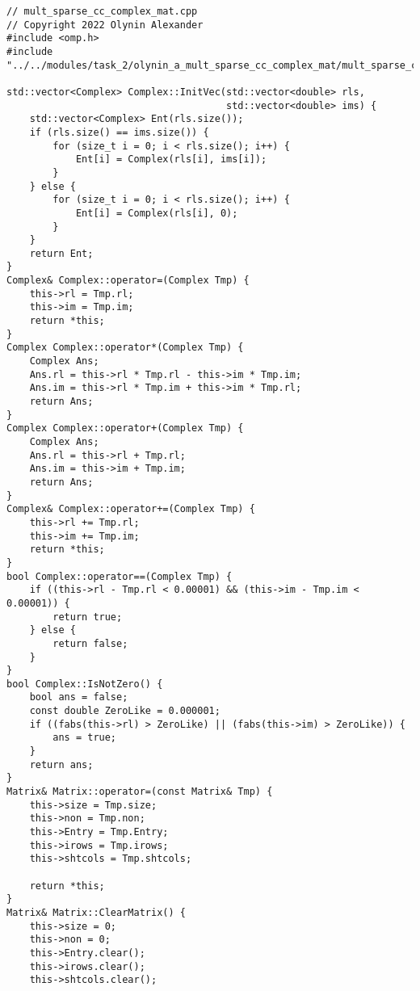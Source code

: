 \documentclass[12pt]{report}
\begin{document}
\begin{lstlisting}
// mult_sparse_cc_complex_mat.cpp
// Copyright 2022 Olynin Alexander
#include <omp.h>
#include "../../modules/task_2/olynin_a_mult_sparse_cc_complex_mat/mult_sparse_cc_complex_mat.h"

std::vector<Complex> Complex::InitVec(std::vector<double> rls,
                                      std::vector<double> ims) {
    std::vector<Complex> Ent(rls.size());
    if (rls.size() == ims.size()) {
        for (size_t i = 0; i < rls.size(); i++) {
            Ent[i] = Complex(rls[i], ims[i]);
        }
    } else {
        for (size_t i = 0; i < rls.size(); i++) {
            Ent[i] = Complex(rls[i], 0);
        }
    }
    return Ent;
}
Complex& Complex::operator=(Complex Tmp) {
    this->rl = Tmp.rl;
    this->im = Tmp.im;
    return *this;
}
Complex Complex::operator*(Complex Tmp) {
    Complex Ans;
    Ans.rl = this->rl * Tmp.rl - this->im * Tmp.im;
    Ans.im = this->rl * Tmp.im + this->im * Tmp.rl;
    return Ans;
}
Complex Complex::operator+(Complex Tmp) {
    Complex Ans;
    Ans.rl = this->rl + Tmp.rl;
    Ans.im = this->im + Tmp.im;
    return Ans;
}
Complex& Complex::operator+=(Complex Tmp) {
    this->rl += Tmp.rl;
    this->im += Tmp.im;
    return *this;
}
bool Complex::operator==(Complex Tmp) {
    if ((this->rl - Tmp.rl < 0.00001) && (this->im - Tmp.im < 0.00001)) {
        return true;
    } else {
        return false;
    }
}
bool Complex::IsNotZero() {
    bool ans = false;
    const double ZeroLike = 0.000001;
    if ((fabs(this->rl) > ZeroLike) || (fabs(this->im) > ZeroLike)) {
        ans = true;
    }
    return ans;
}
Matrix& Matrix::operator=(const Matrix& Tmp) {
    this->size = Tmp.size;
    this->non = Tmp.non;
    this->Entry = Tmp.Entry;
    this->irows = Tmp.irows;
    this->shtcols = Tmp.shtcols;

    return *this;
}
Matrix& Matrix::ClearMatrix() {
    this->size = 0;
    this->non = 0;
    this->Entry.clear();
    this->irows.clear();
    this->shtcols.clear();


\end{lstlisting}
\end{document}
